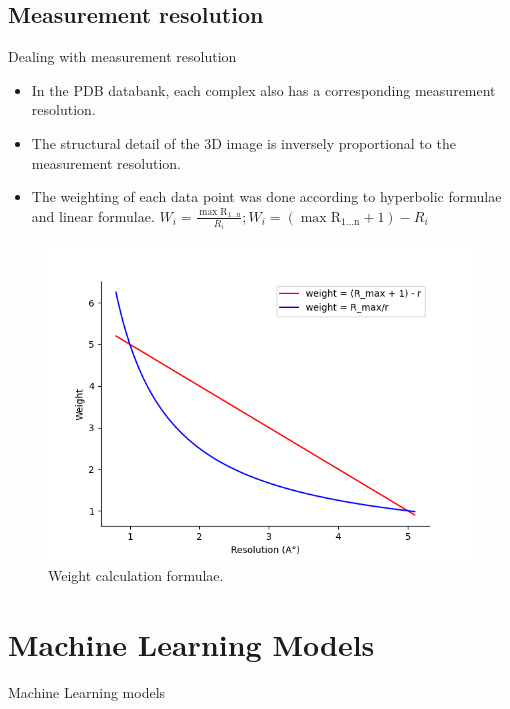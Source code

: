 \documentclass{beamer}
\begin{document}
\subsection{Measurement resolution}
\begin{frame}[t]{Dealing with measurement resolution}
\begin{itemize}
\item In the PDB databank,  each complex also has a corresponding measurement resolution.
\item The structural
detail of the 3D image is inversely proportional to the measurement
resolution.
\item The weighting of each data point was done according to hyperbolic formulae and linear formulae.
$  W_i = \frac{ \mathrm{\max{R_{1 ...  n}}}}{R_i}  ;  W_i = (\mathrm{\max{R_{1 ...  n}}} + 1) - R_i $
\end{itemize}

\begin{figure}
     \centering
         \centering
    \includegraphics[scale=0.3]{images/graphingformula}
    \caption{Weight calculation formulae.}
    \label{fig:graphingformula}
\end{figure}

\end{frame}

\section{Machine Learning Models}
\begin{frame}[t]{Machine Learning models}
\end{frame}
\end{document}
